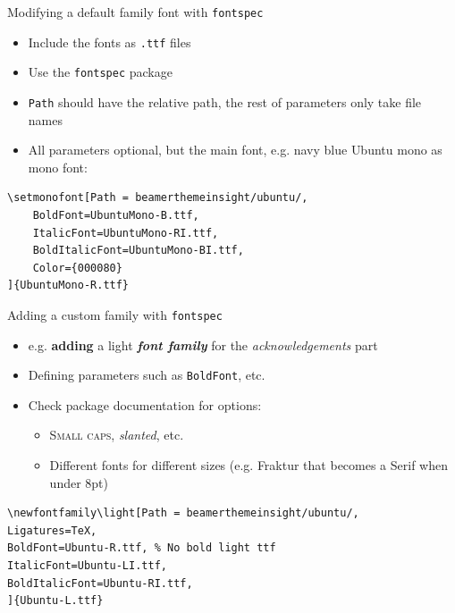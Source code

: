 \documentclass[english]{beamer}
\makeatletter
\newcommand{\verbatimfont}[1]{\def\verbatim@font{#1}}%
\let\olditem\item
\renewcommand{\item}{\setlength{\itemsep}{\fill}\olditem}
\newenvironment{sitemize}{\let\item\olditem \begin{itemize}}{\vfill\end{itemize}}
\let\textttt\texttt
\renewcommand{\texttt}[1]{\colorbox{gray!10}{\textttt{#1}}}
\makeatother
\begin{document}
\begin{frame}[fragile, label=sld_font]{Modifying a default family font with \texttt{fontspec}}
    \begin{itemize}
        \item Include the fonts as \texttt{.ttf} files
        \item Use the \texttt{fontspec} package
        \item \texttt{Path} should have the relative path, the rest of parameters only take file names
        \item All parameters optional, but the main font, e.g. navy blue \colorbox{gray!10}{\ubuntumono Ubuntu mono} as mono font:
    \end{itemize}
{\verbatimfont{\ubuntumono}
\begin{verbatim}
\setmonofont[Path = beamerthemeinsight/ubuntu/, 
    BoldFont=UbuntuMono-B.ttf,
    ItalicFont=UbuntuMono-RI.ttf,
    BoldItalicFont=UbuntuMono-BI.ttf,
    Color={000080}
]{UbuntuMono-R.ttf}
\end{verbatim}
}
\end{frame}

\begin{frame}[fragile]{Adding a custom family with \texttt{fontspec}}
    \begin{itemize}
        \item e.g. {\light \textbf{adding} a light \textbf{\textit{font family}} for the \emph{acknowledgements} part}
        \item Defining parameters such as \texttt{BoldFont}, etc.
        \item Check package documentation for options:
        \begin{sitemize}
            \item {\selectfont \textsc{Small caps}}, {\selectfont \textsl{slanted}}, etc.
            \item Different fonts for different sizes (e.g. Fraktur that becomes a Serif when under 8pt)
        \end{sitemize}
    \end{itemize}
\begin{verbatim}
\newfontfamily\light[Path = beamerthemeinsight/ubuntu/, 
Ligatures=TeX,
BoldFont=Ubuntu-R.ttf, % No bold light ttf 
ItalicFont=Ubuntu-LI.ttf,
BoldItalicFont=Ubuntu-RI.ttf,
]{Ubuntu-L.ttf}
\end{verbatim}
\end{frame}
\end{document}
